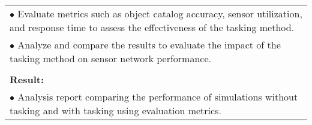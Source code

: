\begin{table}[!h]
\begin{center}
\begin{tabular}{|p{35mm}||p{55mm}|p{50mm}||p{40mm}|}
      \multicolumn{4}{|p{150mm}|}{$\bullet$ Evaluate metrics such as object catalog accuracy, sensor utilization, and response time to assess the effectiveness of the tasking method.} \\
      \multicolumn{4}{|p{150mm}|}{$\bullet$ Analyze and compare the results to evaluate the impact of the tasking method on sensor network performance.} \\
      \multicolumn{4}{|p{150mm}|}{}                                                                                                                                                                           \\
      \multicolumn{4}{|p{150mm}|}{\textbf{Result:}}                                                                                                                                                       \\
      \multicolumn{4}{|p{150mm}|}{$\bullet$ Analysis report comparing the performance of simulations without tasking and with tasking using evaluation metrics.}                                                                                                                          \\
      \hline
    \end{tabular}
  \end{center}
\end{table}

\clearpage

